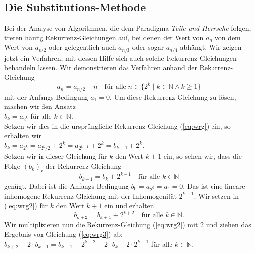 \subsection{Die Substitutions-Methode}
Bei der Analyse von Algorithmen, die dem Paradigma \emph{Teile-und-Herrsche} folgen,
treten häufig Rekurrenz-Gleichungen auf, bei denen der Wert von $a_n$ von dem Wert von
$a_{n/2}$ oder gelegentlich auch $a_{n/3}$ oder sogar $a_{n/4}$ abhängt.  Wir zeigen jetzt
ein Verfahren, mit dessen Hilfe sich auch solche Rekurrenz-Gleichungen behandeln lassen.
Wir demonstrieren das Verfahren anhand der Rekurrenz-Gleichung 
\begin{equation}
  \label{eq:wrg}
a_n = a_{n/2} + n \quad \mbox{für alle $n \in \{ 2^k \mid k \in \mathbb{N} \wedge k \geq 1\}$}  
\end{equation}
mit der Anfangs-Bedingung $a_1 = 0$.   Um diese Rekurrenz-Gleichung zu lösen, machen wir
den Ansatz \\
\hspace*{1.3cm} $b_k = a_{2^k}$ \quad für alle $k \in \mathbb{N}$. \\[0.2cm]
 Setzen wir dies in die
ursprüngliche Rekurrenz-Gleichung (\ref{eq:wrg}) ein, so erhalten wir \\[0.2cm]
\hspace*{1.3cm} 
$b_{k} = a_{2^{k}} = a_{2^{k}/2} + 2^{k} = a_{2^{k-1}} + 2^{k} = b_{k-1}+ 2^{k}$.
\\[0.2cm]
Setzen wir in dieser Gleichung für $k$ den Wert $k+1$ ein, so sehen wir, dass
die Folge $(b_k)_k$ der Rekurrenz-Gleichung 
\begin{equation}
  \label{eq:wrg2}
  b_{k+1} = b_k + 2^{k+1} \quad \mbox{für alle $k \in \mathbb{N}$}
\end{equation}
genügt.  Dabei ist die Anfangs-Bedingung $b_0 = a_{2^0} = a_1 = 0$.  Das ist eine lineare
inhomogene Rekurrenz-Gleichung mit der Inhomogenität $2^{k+1}$. Wir 
setzen in (\ref{eq:wrg2}) für $k$ den Wert $k+1$
ein und erhalten 
\begin{equation}
  \label{eq:wrg3}
  b_{k+2} = b_{k+1} + 2^{k+2} \quad \mbox{für alle $k \in \mathbb{N}$.}
\end{equation}
Wir multiplizieren nun die Rekurrenz-Gleichung (\ref{eq:wrg2}) mit 2 und ziehen das Ergebnis
von Gleichung  (\ref{eq:wrg3}) ab: \\[0.2cm]
\hspace*{1.3cm} 
$b_{k+2} - 2 \cdot b_{k+1} = b_{k+1} + 2^{k+2} - 2 \cdot b_k - 2 \cdot 2^{k+1}$ \quad für alle $k \in \mathbb{N}$. 
\\[0.2cm]
